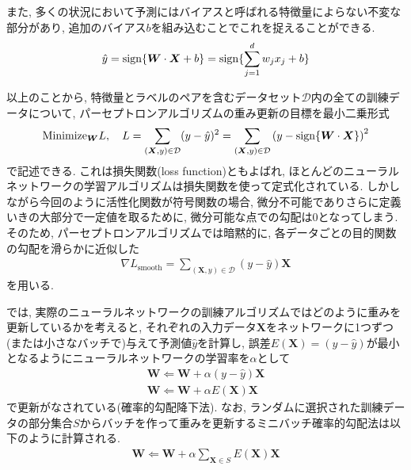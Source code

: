 \documentclass[dvipdfmx,report,11pt]{jsbook}
\begin{document}
また, 多くの状況において予測にはバイアスと呼ばれる特徴量によらない不変な部分があり, 追加のバイアス$b$を組み込むことでこれを捉えることができる.
\begin{align}
  \hat{y}=\operatorname{sign}\{\bm{W}\cdot\bm{X}+b\}=\operatorname{sign}\{\sum_{j=1}^{d}w_jx_j+b\}
\end{align}



以上のことから, 特徴量とラベルのペアを含むデータセット$\mathcal{D}$内の全ての訓練データについて, パーセプトロンアルゴリズムの重み更新の目標を最小二乗形式
\begin{align}
  \text{Minimize}_{\bm{W}} L, \quad L=\sum_{(\bm{X},y)\in \mathcal{D}}(y-\hat{y})^2=\sum_{(\bm{X},y)\in \mathcal{D}}\left(y-\operatorname{sign}\{\bm{W}\cdot\bm{X}\}\right)^2\notag
\end{align}
で記述できる. これは損失関数(loss function)ともよばれ, ほとんどのニューラルネットワークの学習アルゴリズムは損失関数を使って定式化されている. しかしながら今回のように活性化関数が符号関数の場合, 微分不可能でありさらに定義いきの大部分で一定値を取るために, 微分可能な点での勾配は0となってしまう. そのため, パーセプトロンアルゴリズムでは暗黙的に, 各データごとの目的関数の勾配を滑らかに近似した
\begin{align}
  \nabla L_{\text{smooth}}=\sum_{(\bm{X},y)\in \mathcal{D}}(y-\hat{y})\bm{X}
\end{align}
を用いる.

では, 実際のニューラルネットワークの訓練アルゴリズムではどのように重みを更新しているかを考えると, それぞれの入力データ$\bm{X}$をネットワークに1つずつ(または小さなバッチで)与えて予測値$\hat{y}$を計算し, 誤差$E(\bm{X})=(y-\hat{y})$が最小となるようにニューラルネットワークの学習率を$\alpha$として
\begin{align}
  \bm{W}\Leftarrow \bm{W}+\alpha (y-\hat{y})\bm{X}\label{eq:1.4}\\
  \bm{W}\Leftarrow \bm{W}+\alpha E(\bm{X})\bm{X}
\end{align}
で更新がなされている(確率的勾配降下法). なお, ランダムに選択された訓練データの部分集合$S$からバッチを作って重みを更新するミニバッチ確率的勾配法は以下のように計算される.
\begin{align}
  \bm{W}\Leftarrow \bm{W}+\alpha \sum_{\bm{X}\in S}E(\bm{X})\bm{X}\label{eq:1.6}
\end{align}
\end{document}
